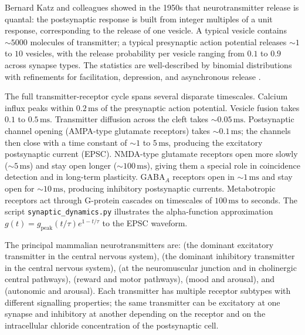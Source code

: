  Bernard Katz and colleagues showed in the
1950s that neurotransmitter release is quantal: the postsynaptic
response is built from integer multiples of a unit response,
corresponding to the release of one vesicle. A typical vesicle
contains $\sim 5000$ molecules of transmitter; a typical presynaptic
action potential releases $\sim 1$ to $10$ vesicles, with the release
probability per vesicle ranging from $0.1$ to $0.9$ across synapse
types. The statistics are well-described by binomial distributions
with refinements for facilitation, depression, and asynchronous
release \cite[ch.~12]{text:v6c07-kandel-principles-2021}.

 The full transmitter-receptor cycle
spans several disparate timescales. Calcium influx peaks within
$0.2\,\text{ms}$ of the presynaptic action potential. Vesicle fusion
takes $0.1$ to $0.5\,\text{ms}$. Transmitter diffusion across the
cleft takes $\sim 0.05\,\text{ms}$. Postsynaptic channel opening
(AMPA-type glutamate receptors) takes $\sim 0.1\,\text{ms}$; the
channels then close with a time constant of $\sim 1$ to $5\,\text{ms}$,
producing the excitatory postsynaptic current (EPSC). NMDA-type
glutamate receptors open more slowly ($\sim 5\,\text{ms}$) and stay
open longer ($\sim 100\,\text{ms}$), giving them a special role in
coincidence detection and in long-term plasticity. GABA$_A$ receptors
open in $\sim 1\,\text{ms}$ and stay open for $\sim 10\,\text{ms}$,
producing inhibitory postsynaptic currents. Metabotropic receptors
act through G-protein cascades on timescales of $100\,\text{ms}$ to
seconds. The script \verb|synaptic_dynamics.py| illustrates the
alpha-function approximation $g(t) = g_{\text{peak}} (t/\tau)
e^{1-t/\tau}$ to the EPSC waveform.

 The principal mammalian neurotransmitters
are:  (the dominant excitatory transmitter in the
central nervous system),  (the dominant inhibitory
transmitter in the central nervous system), 
(at the neuromuscular junction and in cholinergic central pathways),
 (reward and motor pathways), 
(mood and arousal), and  (autonomic and
arousal). Each transmitter has multiple receptor subtypes with
different signalling properties; the same transmitter can be
excitatory at one synapse and inhibitory at another depending on the
receptor and on the intracellular chloride concentration of the
postsynaptic cell.

